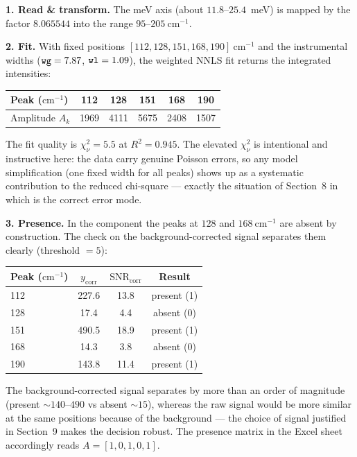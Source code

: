 \documentclass[11pt,a4paper]{article}
\begin{document}
\textbf{1. Read \& transform.} The meV axis (about $11.8$--$25.4$~meV) is mapped by
the factor $8.065544$ into the range $95$--$205~\mathrm{cm}^{-1}$.

\textbf{2. Fit.} With fixed positions $[112, 128, 151, 168, 190]~\mathrm{cm}^{-1}$
and the instrumental widths ($\code{wg}=7.87$, $\code{wl}=1.09$), the weighted
NNLS fit returns the integrated intensities:

\begin{table}[h]\small\centering
\begin{tabular}{@{}lccccc@{}}
\toprule
Peak ($\mathrm{cm}^{-1}$) & 112 & 128 & 151 & 168 & 190\\
\midrule
Amplitude $A_k$ & 1969 & 4111 & 5675 & 2408 & 1507\\
\bottomrule
\end{tabular}
\end{table}

The fit quality is $\chi^2_\nu = 5.5$ at $R^2 = 0.945$. The elevated $\chi^2_\nu$
is intentional and instructive here: the data carry genuine Poisson errors, so any
model simplification (one fixed width for all peaks) shows up as a systematic
contribution to the reduced chi-square --- exactly the situation of Section~8 in
which  is the correct error mode.

\textbf{3. Presence.} In the component  the peaks at $128$ and
$168~\mathrm{cm}^{-1}$ are absent by construction. The check on the
background-corrected signal separates them clearly (threshold
${}=5$):

\begin{table}[h]\small\centering
\begin{tabular}{@{}lccc@{}}
\toprule
Peak ($\mathrm{cm}^{-1}$) & $y_{\text{corr}}$ & $\mathrm{SNR}_{\text{corr}}$ & Result\\
\midrule
112 & 227.6 & 13.8 & present (1)\\
128 & 17.4  & 4.4  & absent (0)\\
151 & 490.5 & 18.9 & present (1)\\
168 & 14.3  & 3.8  & absent (0)\\
190 & 143.8 & 11.4 & present (1)\\
\bottomrule
\end{tabular}
\end{table}

The background-corrected signal separates by more than an order of magnitude
(present ${\sim}140$--$490$ vs absent ${\sim}15$), whereas the raw signal would be
more similar at the same positions because of the background --- the choice of
signal justified in Section~9 makes the decision robust. The presence matrix in
the Excel sheet accordingly reads $A = [1, 0, 1, 0, 1]$.
\end{document}

